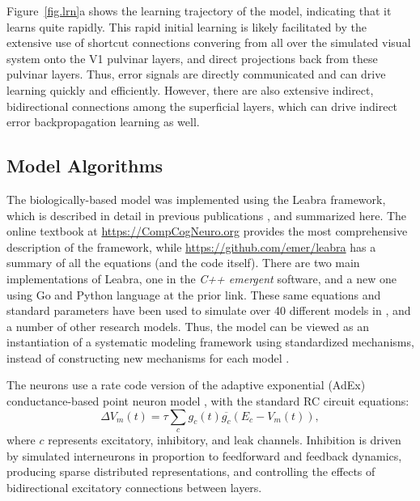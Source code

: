 Figure~\ref{fig.lrn}a shows the learning trajectory of the model, indicating that it learns quite rapidly.  This rapid initial learning is likely facilitated by the extensive use of shortcut connections convering from all over the simulated visual system onto the V1 pulvinar layers, and direct projections back from these pulvinar layers.  Thus, error signals are directly communicated and can drive learning quickly and efficiently.  However, there are also extensive indirect, bidirectional connections among the superficial layers, which can drive indirect error backpropagation learning as well.

\subsection{Model Algorithms}

The biologically-based model was implemented using the Leabra framework, which is described in detail in previous publications \citep{OReillyHazyHerd16,OReillyMunakataFrankEtAl12,OReillyMunakata00,OReilly98,OReilly96}, and summarized here.  The online textbook at \url{https://CompCogNeuro.org} provides the most comprehensive description of the framework, while \url{https://github.com/emer/leabra} has a summary of all the equations (and the code itself).  There are two main implementations of Leabra, one in the {\em C++ emergent} software, and a new one using Go and Python language at the prior link.  These same equations and standard parameters have been used to simulate over 40 different models in \citet{OReillyMunakataFrankEtAl12,OReillyMunakata00}, and a number of other research models.  Thus, the model can be viewed as an instantiation of a systematic modeling framework using standardized mechanisms, instead of constructing new mechanisms for each model \citep{OReillyHazyHerd16}.

The neurons use a rate code version of the adaptive exponential (AdEx) conductance-based point neuron model \citep{BretteGerstner05}, with the standard RC circuit equations:
\begin{equation}
 \Delta V_m(t) = \tau \sum_c g_c(t) \overline{g_c} (E_c - V_m(t)),
 \label{eq.vm}
\end{equation}
where $c$ represents excitatory, inhibitory, and leak channels.  Inhibition is driven by simulated interneurons in proportion to feedforward and feedback dynamics, producing sparse distributed representations, and controlling the effects of bidirectional excitatory connections between layers.

